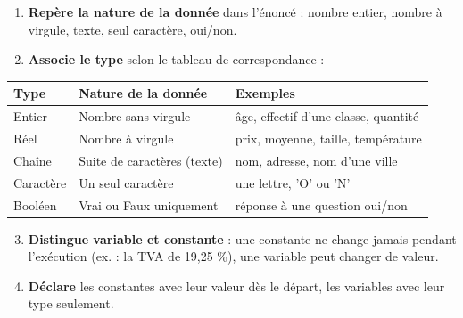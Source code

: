 \documentclass[11pt]{article}
\newcommand{\cle}[1]{{\popxbold\color{popdark}#1}}
\begin{document}
\begin{methode}
\begin{enumerate}
  \item \textbf{Repère la nature de la donnée} dans l'énoncé : nombre entier, nombre à virgule, texte, seul caractère, oui/non.
  \item \textbf{Associe le type} selon le tableau de correspondance :
\end{enumerate}
\begin{center}
\begin{tabularx}{\linewidth}{|l|X|X|}
\hline
\rowcolor{popblueL} \textbf{Type} & \textbf{Nature de la donnée} & \textbf{Exemples} \\
\hline
Entier & Nombre sans virgule & âge, effectif d'une classe, quantité \\
\hline
Réel & Nombre à virgule & prix, moyenne, taille, température \\
\hline
Chaîne & Suite de caractères (texte) & nom, adresse, nom d'une ville \\
\hline
Caractère & Un seul caractère & une lettre, 'O' ou 'N' \\
\hline
Booléen & Vrai ou Faux uniquement & réponse à une question oui/non \\
\hline
\end{tabularx}
\end{center}
\begin{enumerate}
  \setcounter{enumi}{2}
  \item \textbf{Distingue variable et constante} : une \cle{constante} ne change jamais pendant l'exécution (ex. : la TVA de 19,25 \%), une \cle{variable} peut changer de valeur.
  \item \textbf{Déclare} les constantes avec leur valeur dès le départ, les variables avec leur type seulement.
\end{enumerate}
\end{methode}
\end{document}
